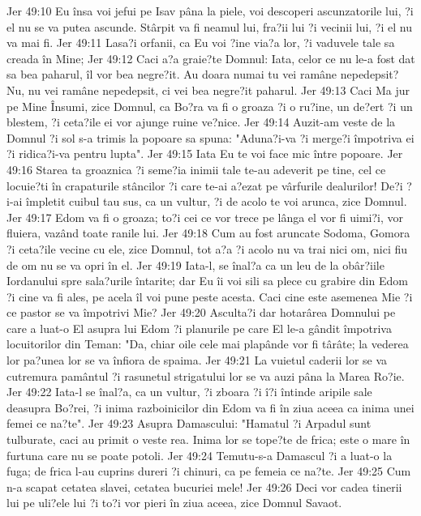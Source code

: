 Jer 49:10  Eu însa voi jefui pe Isav pâna la piele, voi descoperi ascunzatorile lui, ?i el nu se va putea ascunde. Stârpit va fi neamul lui, fra?ii lui ?i vecinii lui, ?i el nu va mai fi.
Jer 49:11  Lasa?i orfanii, ca Eu voi ?ine via?a lor, ?i vaduvele tale sa creada în Mine;
Jer 49:12  Caci a?a graie?te Domnul: Iata, celor ce nu le-a fost dat sa bea paharul, îl vor bea negre?it. Au doara numai tu vei ramâne nepedepsit? Nu, nu vei ramâne nepedepsit, ci vei bea negre?it paharul.
Jer 49:13  Caci Ma jur pe Mine Însumi, zice Domnul, ca Bo?ra va fi o groaza ?i o ru?ine, un de?ert ?i un blestem, ?i ceta?ile ei vor ajunge ruine ve?nice.
Jer 49:14  Auzit-am veste de la Domnul ?i sol s-a trimis la popoare sa spuna: "Aduna?i-va ?i merge?i împotriva ei ?i ridica?i-va pentru lupta".
Jer 49:15  Iata Eu te voi face mic între popoare.
Jer 49:16  Starea ta groaznica ?i seme?ia inimii tale te-au adeverit pe tine, cel ce locuie?ti în crapaturile stâncilor ?i care te-ai a?ezat pe vârfurile dealurilor! De?i ?i-ai împletit cuibul tau sus, ca un vultur, ?i de acolo te voi arunca, zice Domnul.
Jer 49:17  Edom va fi o groaza; to?i cei ce vor trece pe lânga el vor fi uimi?i, vor fluiera, vazând toate ranile lui.
Jer 49:18  Cum au fost aruncate Sodoma, Gomora ?i ceta?ile vecine cu ele, zice Domnul, tot a?a ?i acolo nu va trai nici om, nici fiu de om nu se va opri în el.
Jer 49:19  Iata-l, se înal?a ca un leu de la obâr?iile Iordanului spre sala?urile întarite; dar Eu îi voi sili sa plece cu grabire din Edom ?i cine va fi ales, pe acela îl voi pune peste acesta. Caci cine este asemenea Mie ?i ce pastor se va împotrivi Mie?
Jer 49:20  Asculta?i dar hotarârea Domnului pe care a luat-o El asupra lui Edom ?i planurile pe care El le-a gândit împotriva locuitorilor din Teman: "Da, chiar oile cele mai plapânde vor fi târâte; la vederea lor pa?unea lor se va înfiora de spaima.
Jer 49:21  La vuietul caderii lor se va cutremura pamântul ?i rasunetul strigatului lor se va auzi pâna la Marea Ro?ie.
Jer 49:22  Iata-l se înal?a, ca un vultur, ?i zboara ?i î?i întinde aripile sale deasupra Bo?rei, ?i inima razboinicilor din Edom va fi în ziua aceea ca inima unei femei ce na?te".
Jer 49:23  Asupra Damascului: "Hamatul ?i Arpadul sunt tulburate, caci au primit o veste rea. Inima lor se tope?te de frica; este o mare în furtuna care nu se poate potoli.
Jer 49:24  Temutu-s-a Damascul ?i a luat-o la fuga; de frica l-au cuprins dureri ?i chinuri, ca pe femeia ce na?te.
Jer 49:25  Cum n-a scapat cetatea slavei, cetatea bucuriei mele!
Jer 49:26  Deci vor cadea tinerii lui pe uli?ele lui ?i to?i vor pieri în ziua aceea, zice Domnul Savaot.
